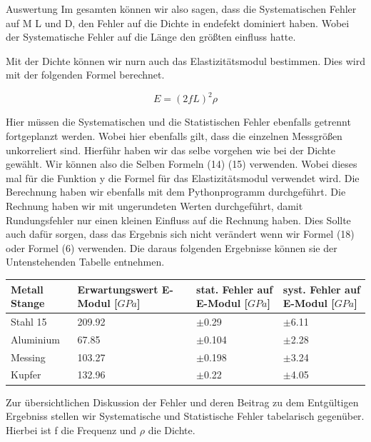 \documentclass[twoside]{protokoll}
\begin{document}
\begin{aufgabe}{Auswertung}
Im gesamten können wir also sagen, dass die Systematischen Fehler auf M L und D, den
Fehler auf die Dichte in endefekt dominiert haben. Wobei der Systematische Fehler auf
die Länge den größten einfluss hatte.  

Mit der Dichte können wir nurn auch das Elastizitätsmodul bestimmen. Dies wird mit der folgenden Formel berechnet. 

    \begin{equation}
         E = (2fL)^2 \rho
    \end{equation}
    
Hier müssen die Systematischen und die Statistischen Fehler ebenfalls getrennt fortgeplanzt werden. Wobei hier ebenfalls gilt, dass die einzelnen Messgrößen 
unkorreliert sind. Hierführ haben wir das selbe vorgehen wie bei der Dichte gewählt.
Wir können also die Selben Formeln (14) (15) verwenden. 
Wobei dieses mal für die Funktion y die Formel für das Elastizitätsmodul verwendet wird. Die Berechnung haben wir ebenfalls mit dem Pythonprogramm durchgeführt. 
Die Rechnung haben wir mit ungerundeten Werten durchgeführt, damit Rundungsfehler nur einen kleinen Einfluss auf die Rechnung haben. 
Dies Sollte auch dafür sorgen, dass das Ergebnis sich nicht verändert wenn wir Formel (18) oder Formel (6) verwenden.
Die daraus folgenden Ergebnisse können sie der Untenstehenden Tabelle entnehmen. 

 \begin{table}[H]
        \centering
        \begin{tabularx}{1\textwidth}{X X X X} %
            \toprule
            \textbf{Metall Stange} & \textbf{Erwartungswert E-Modul [$GPa$]} & \textbf{stat. Fehler auf E-Modul [$GPa$]} & \textbf{syst. Fehler auf E-Modul [$GPa$]}\\
            \midrule
            Stahl 15 & 209.92 & $\pm$0.29  & $\pm$6.11 \\
            Aluminium & 67.85 & $\pm$0.104 & $\pm$2.28 \\
            Messing & 103.27  & $\pm$0.198 & $\pm$3.24 \\
            Kupfer & 132.96   & $\pm$0.22  & $\pm$4.05 \\
            \bottomrule
        \end{tabularx}
        \label{tab:mytable}
    \end{table}

Zur übersichtlichen Diskussion der Fehler und deren Beitrag zu dem Entgültigen Ergebniss stellen wir Systematische und Statistische Fehler tabelarisch gegenüber.
Hierbei ist f die Frequenz und $\rho$ die Dichte.


\end{aufgabe}
\end{document}
